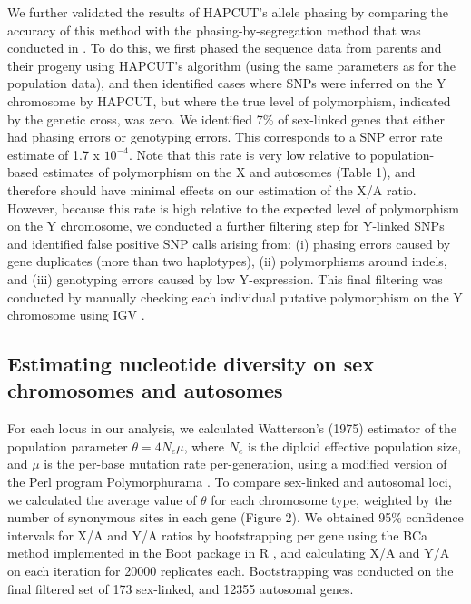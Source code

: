 \documentclass[9pt,twocolumn,twoside,lineno]{gsajnl}
\begin{document}
We further validated the results of HAPCUT’s allele phasing by comparing the accuracy of this method with the phasing-by-segregation method that was conducted in \citet{hough2014}. To do this, we first phased the sequence data from parents and their progeny using HAPCUT’s algorithm (using the same parameters as for the population data), and then identified cases where SNPs were inferred on the Y chromosome by HAPCUT, but where the true level of polymorphism, indicated by the genetic cross, was zero. We identified 7\% of sex-linked genes that either had phasing errors or genotyping errors. This corresponds to a SNP error rate estimate of 1.7 x $10^{-4}$. Note that this rate is very low relative to population-based estimates of polymorphism on the X and autosomes (Table 1), and therefore should have minimal effects on our estimation of the X/A ratio. However, because this rate is high relative to the expected level of polymorphism on the Y chromosome, we conducted a further filtering step for Y-linked SNPs and identified false positive SNP calls arising from: (i) phasing errors caused by gene duplicates (more than two haplotypes), (ii) polymorphisms around indels, and (iii) genotyping errors caused by low Y-expression. This final filtering was conducted by manually checking each individual putative polymorphism on the Y chromosome using IGV \citep{robinson2011integrative}.

\subsection*{Estimating nucleotide diversity on sex chromosomes and autosomes}
For each locus in our analysis, we calculated Watterson’s (1975) estimator of the population parameter $\theta=4N_{e}\mu$, where $N_{e}$ is the diploid effective population size, and $\mu$ is the per-base mutation rate per-generation, using a modified version of the Perl program Polymorphurama \citep{bachtrog2006}. To compare sex-linked and autosomal loci, we calculated the average value of $\theta$ for each chromosome type, weighted by the number of synonymous sites in each gene (Figure 2). We obtained 95\% confidence intervals for X/A and Y/A ratios by bootstrapping per gene using the BCa method \citep{efron1994} implemented in the Boot package in R \citep{canty2012boot}, and calculating X/A and Y/A on each iteration for 20000 replicates each. Bootstrapping was conducted on the final filtered set of 173 sex-linked, and 12355 autosomal genes.
\end{document}
